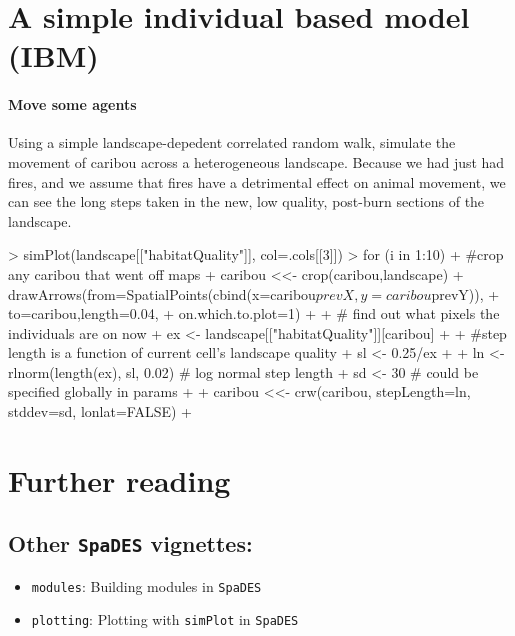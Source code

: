\documentclass{article}
\begin{document}
\section{A simple individual based model (IBM)}
\paragraph{Move some agents}
Using a simple landscape-depedent correlated random walk, simulate the movement of caribou across a heterogeneous landscape. Because we had just had fires, and we assume that fires have a detrimental effect on animal movement, we can see the long steps taken in the new, low quality, post-burn sections of the landscape.

\begin{Schunk}
\begin{Sinput}
> simPlot(landscape[["habitatQuality"]], col=.cols[[3]])
> for (i in 1:10) {
+   #crop any caribou that went off maps
+   caribou <<- crop(caribou,landscape)
+   drawArrows(from=SpatialPoints(cbind(x=caribou$prevX, y=caribou$prevY)),
+              to=caribou,length=0.04,
+              on.which.to.plot=1)
+ 
+   # find out what pixels the individuals are on now
+   ex <- landscape[["habitatQuality"]][caribou]
+ 
+   #step length is a function of current cell's landscape quality
+   sl <- 0.25/ex
+ 
+   ln <- rlnorm(length(ex), sl, 0.02) # log normal step length
+   sd <- 30 # could be specified globally in params
+ 
+   caribou <<- crw(caribou, stepLength=ln, stddev=sd, lonlat=FALSE)
+ }
\end{Sinput}
\end{Schunk}

\newpage

\section{Further reading}

\subsection{Other \texttt{SpaDES} vignettes:}

\begin{itemize}
\item \texttt{modules}: Building modules in \texttt{SpaDES}
\item \texttt{plotting}: Plotting with \texttt{simPlot} in \texttt{SpaDES}
\end{itemize}
\end{document}
